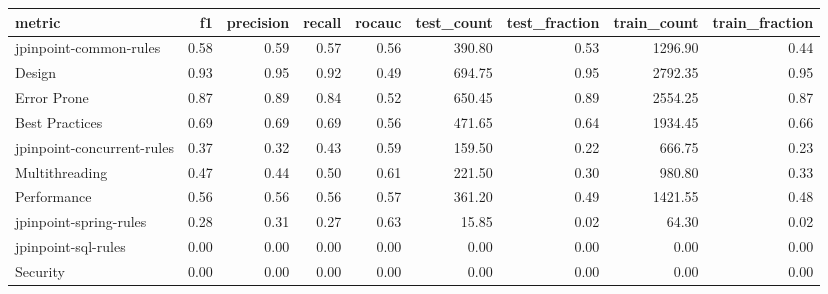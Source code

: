\begin{tabular}{lrrrrrrrr}
\toprule
metric &   f1 &  precision &  recall &  rocauc &  test\_count &  test\_fraction &  train\_count &  train\_fraction \\
\midrule
jpinpoint-common-rules     & 0.58 &       0.59 &    0.57 &    0.56 &      390.80 &           0.53 &      1296.90 &            0.44 \\
Design                     & 0.93 &       0.95 &    0.92 &    0.49 &      694.75 &           0.95 &      2792.35 &            0.95 \\
Error Prone                & 0.87 &       0.89 &    0.84 &    0.52 &      650.45 &           0.89 &      2554.25 &            0.87 \\
Best Practices             & 0.69 &       0.69 &    0.69 &    0.56 &      471.65 &           0.64 &      1934.45 &            0.66 \\
jpinpoint-concurrent-rules & 0.37 &       0.32 &    0.43 &    0.59 &      159.50 &           0.22 &       666.75 &            0.23 \\
Multithreading             & 0.47 &       0.44 &    0.50 &    0.61 &      221.50 &           0.30 &       980.80 &            0.33 \\
Performance                & 0.56 &       0.56 &    0.56 &    0.57 &      361.20 &           0.49 &      1421.55 &            0.48 \\
jpinpoint-spring-rules     & 0.28 &       0.31 &    0.27 &    0.63 &       15.85 &           0.02 &        64.30 &            0.02 \\
jpinpoint-sql-rules        & 0.00 &       0.00 &    0.00 &    0.00 &        0.00 &           0.00 &         0.00 &            0.00 \\
Security                   & 0.00 &       0.00 &    0.00 &    0.00 &        0.00 &           0.00 &         0.00 &            0.00 \\
\bottomrule
\end{tabular}
